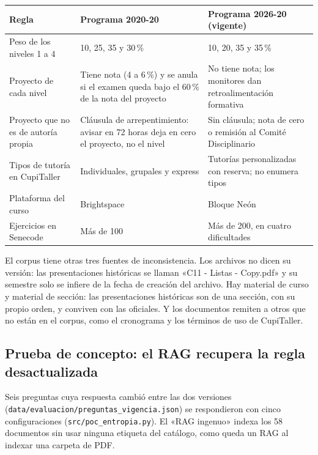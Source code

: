 \documentclass[11pt,letterpaper]{article}
\newcommand{\cod}[1]{\texttt{\small #1}}
\begin{document}
\begin{table}[H]\small\renewcommand{\arraystretch}{1.15}
\begin{tabularx}{\textwidth}{>{\raggedright\arraybackslash}p{}LL}
\toprule
\textbf{Regla} & \textbf{Programa 2020-20} & \textbf{Programa 2026-20 (vigente)} \\
\midrule
Peso de los niveles 1 a 4 & 10, 25, 35 y 30\,\% & 10, 20, 35 y 35\,\% \\
Proyecto de cada nivel & Tiene nota (4 a 6\,\%) y se anula si el examen queda bajo el 60\,\% de la nota del proyecto & No tiene nota; los monitores dan retroalimentación formativa \\
Proyecto que no es de autoría propia & Cláusula de arrepentimiento: avisar en 72 horas deja en cero el proyecto, no el nivel & Sin cláusula; nota de cero o remisión al Comité Disciplinario \\
Tipos de tutoría en CupiTaller & Individuales, grupales y express & Tutorías personalizadas con reserva; no enumera tipos \\
Plataforma del curso & Brightspace & Bloque Neón \\
Ejercicios en Senecode & Más de 100 & Más de 200, en cuatro dificultades \\
\bottomrule
\end{tabularx}
\end{table}

El corpus tiene otras tres fuentes de inconsistencia. Los archivos no dicen su versión: las presentaciones históricas se llaman «C11 - Listas - Copy.pdf» y su semestre solo se infiere de la fecha de creación del archivo. Hay material de curso y material de sección: las presentaciones históricas son de una sección, con su propio orden, y conviven con las oficiales. Y los documentos remiten a otros que no están en el corpus, como el cronograma y los términos de uso de CupiTaller.

\subsection{Prueba de concepto: el RAG recupera la regla desactualizada}
\label{sec:poc}

Seis preguntas cuya respuesta cambió entre las dos versiones (\cod{data/evaluacion/preguntas\_vigencia.json}) se respondieron con cinco configuraciones (\cod{src/poc\_entropia.py}). El «RAG ingenuo» indexa los 58 documentos sin usar ninguna etiqueta del catálogo, como queda un RAG al indexar una carpeta de PDF.
\end{document}
